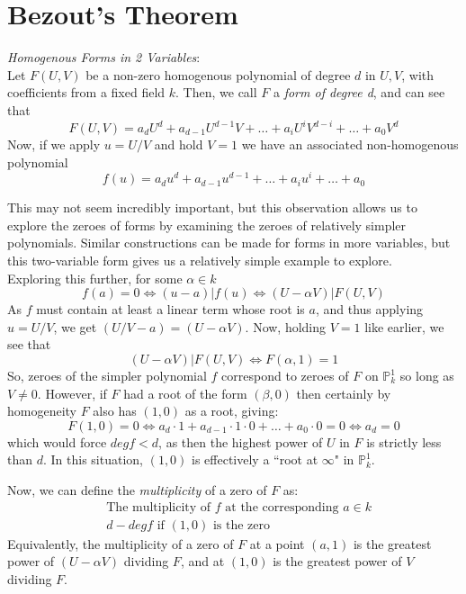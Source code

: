 \section{Bezout's Theorem}

\begin{theorem}
\emph{Homogenous Forms in 2 Variables}:\\

Let $F(U,V)$ be a non-zero homogenous polynomial of degree $d$ in $U,V$,
with coefficients from a fixed field $k$. Then, we call $F$ a \emph{form of degree d},
and can see that
\[
F(U,V) = a_dU^d+a_{d-1}U^{d-1}V + \dots + a_iU^iV^{d-i}+\dots+a_0V^d
\]
Now, if we apply $u=U/V$ and hold $V=1$ we have an associated non-homogenous polynomial
\[
f(u) = a_du^d + a_{d-1}u^{d-1} + \dots + a_iu^i + \dots + a_0
\]
\end{theorem}


This may not seem incredibly important, but this observation
allows us to explore the zeroes of forms by examining the zeroes
of relatively simpler polynomials. Similar constructions can be made
for forms in more variables, but this two-variable form gives us a relatively
simple example to explore.\\

Exploring this further, for some $\alpha \in k$
\[ %
f(a) = 0 \iff (u-a)|f(u) \iff (U-\alpha V) | F(U,V)
\]
As $f$ must contain at least a linear term whose root is $a$, and
thus applying $u=U/V$, we get $(U/V - a) = (U - \alpha V)$. Now, 
holding $V=1$ like earlier, we see that
\[
(U-\alpha V) | F(U,V) \iff F(\alpha,1) = 1
\]
So, zeroes of the simpler polynomial $f$ correspond to zeroes of $F$
on $\mathbb{P}^1_k$ so long as $V \ne 0$. However, if $F$ had a root
of the form $(\beta,0)$ then certainly by homogeneity $F$ also has
$(1,0)$ as a root, giving:
\[
F(1,0) = 0 \iff a_d \cdot 1 + a_{d-1} \cdot 1 \cdot 0 + \dots + a_0 \cdot 0 = 0 \iff a_d = 0
\]
which would force $deg f < d$, as then the highest power of $U$ in $F$ is strictly
less than $d$. In this situation, $(1,0)$ is effectively a ``root at $\infty$" in $\mathbb{P}^1_k$.

Now, we can define the \emph{multiplicity} of a zero of $F$ as:
\begin{align*}
&\text{The multiplicity of $f$ at the corresponding $a \in k$} \tag{i}\\
&\text{$d - deg f$ if $(1,0)$ is the zero} \tag{ii}
\end{align*}
Equivalently, the multiplicity of a zero of $F$ at a point $(a,1)$
is the greatest power of $(U - \alpha V)$ dividing $F$, and at $(1,0)$
is the greatest power of $V$ dividing $F$.

